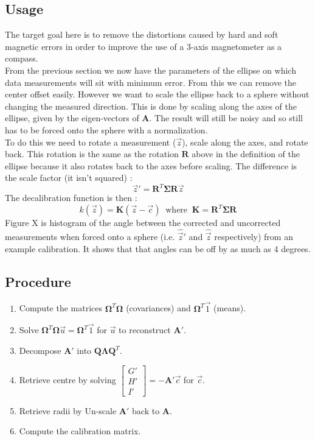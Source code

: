 \documentclass{article}
\def\mat#1{\mathbf{#1}}
\begin{document}
\subsection{Usage}
The target goal here is to remove the distortions caused by hard and soft magnetic errors in order to improve the use of a 3-axis magnetometer as a compass.
\\
From the previous section we now have the parameters of the ellipse on which data measurements 
will sit with minimum error. From this we can remove the center offset easily.
However we want to scale the ellipse back to a sphere without changing the measured direction.
This is done by scaling along the axes of the ellipse, given by the eigen-vectors of $\mat{A}$. The result will still be noisy and so still has to be forced onto the sphere with a normalization.
\\
To do this we need to rotate a measurement ($\vec{z}$), scale along the axes, and rotate back. This rotation is the same as the rotation $\mat{R}$ above in the definition of the ellipse because it also rotates back to the axes before scaling. The difference is the scale factor (it isn't squared) :
\begin{equation}
\vec{z}' = \mat{R}^T \mat{\Sigma} \mat{R} \vec{z}
\end{equation}
The decalibration function is then :
\begin{equation}
k(\vec{z}) = \mat{K}\left( \vec{z} - \vec{c} \right)~\text{ where }~\mat{K} = \mat{R}^T \mat{\Sigma} \mat{R}
\end{equation}
Figure X is histogram of the angle between the corrected and uncorrected measurements when forced onto a sphere (i.e. $\hat{\vec{z}}'$ and $\hat{\vec{z}}$ respectively) from an example calibration. It shows that that angles can be off by as much as 4 degrees.
\subsection{Procedure}
\begin{enumerate}
\item Compute the matrices $\mat{\Omega}^T \mat{\Omega}$ (covariances) and $\mat{\Omega}^T \vec{1}$ (means).
\item Solve $\mat{\Omega}^T \mat{\Omega} \vec{u} = \mat{\Omega}^T \vec{1}$ for $\vec{u}$ to reconstruct $\mat{A}'$.
\item Decompose $\mat{A'}$ into $\mat{Q}\mat{\Lambda}\mat{Q}^T$.
\item Retrieve centre by solving $\left[\begin{smallmatrix} G'\\H'\\I' \end{smallmatrix}\right] = -\mat{A'}\vec{c}$ for $\vec{c}$.
\item Retrieve radii by Un-scale $\mat{A'}$ back to $\mat{A}$.
\item Compute the calibration matrix.
\end{enumerate}
\end{document}
